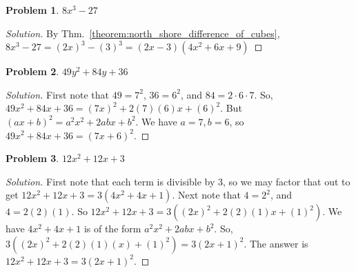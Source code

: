\documentclass[oneside]{book}
\theoremstyle{mystyle}
\newtheorem{problem}{Problem}[section]
\begin{document}
\begin{problem}
$8x^3 - 27$
\end{problem}
\begin{proof}[Solution]
By Thm.~\ref{theorem:north_shore_difference_of_cubes}, $8x^3 - 27 = (2x)^3 - (3)^3 = (2x-3)(4x^2+6x+9)$
\end{proof}
\begin{problem}
$49y^2 + 84y + 36$
\end{problem}
\begin{proof}[Solution]
First note that $49 = 7^2$, $36 = 6^2$, and $84 = 2\cdot 6 \cdot 7$. So, $49x^2 + 84x + 36 = (7x)^2 + 2(7)(6)x + (6)^2$. But $(ax+b)^2 = a^2x^2 + 2abx + b^2$. We have $a=7,b=6$, so $49x^2 + 84x + 36 = (7x+6)^2$.
\end{proof}
\begin{problem}
$12x^2 + 12x + 3$
\end{problem}
\begin{proof}[Solution]
First note that each term is divisible by $3$, so we may factor that out to get $12x^2 + 12x + 3 = 3(4x^2+4x+1)$. Next note that $4 = 2^2$, and $4 = 2(2)(1)$. So $12x^2+12x+3 = 3((2x)^2 + 2(2)(1)x + (1)^2)$. We have $4x^2 + 4x + 1$ is of the form $a^2x^2 + 2abx + b^2$. So, $3((2x)^2+2(2)(1)(x) + (1)^2) = 3(2x+1)^2$. The answer is $12x^2+12x+3 = 3(2x+1)^2$.
\end{proof}
\end{document}
